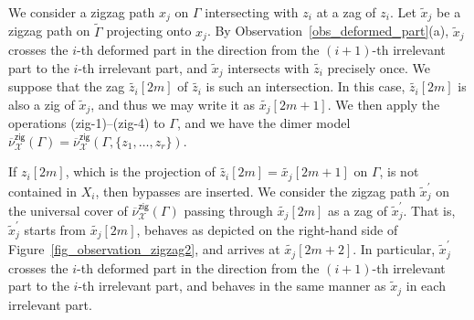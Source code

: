 \documentclass[11pt]{article}
\numberwithin{equation}{section}
\numberwithin{equation}{section}
\numberwithin{figure}{section}
\numberwithin{table}{section}
\newcommand{\calX}{\mathcal{X}}
\newcommand{\zig}{\mathsf{zig}}
\begin{document}
\begin{observation}
\label{obs_deformed_part3}
We consider a zigzag path $x_j$ on $\Gamma$ intersecting with $z_i$ at a zag of $z_i$.
Let $\widetilde{x}_j$ be a zigzag path on $\widetilde{\Gamma}$ projecting onto $x_j$.
By Observation~\ref{obs_deformed_part}(a), $\widetilde{x}_j$ crosses the $i$-th deformed part in the direction from the $(i+1)$-th irrelevant part to the $i$-th irrelevant part, and $\widetilde{x}_j$ intersects with $\widetilde{z_i}$ precisely once.
We suppose that the zag $\widetilde{z_i}[2m]$ of $\widetilde{z_i}$ is such an intersection.
In this case, $\widetilde{z_i}[2m]$ is also a zig of $\widetilde{x}_j$, and thus we may write it as $\widetilde{x_j}[2m+1]$.
We then apply the operations (zig-1)--(zig-4) to $\Gamma$, and we have the dimer model $\overline{\nu}_\calX^\zig(\Gamma)=\overline{\nu}_\calX^\zig(\Gamma,\{z_1,\dots,z_r\})$.

If $z_i[2m]$, which is the projection of $\widetilde{z_i}[2m]=\widetilde{x_j}[2m+1]$ on $\Gamma$, is not contained in $X_i$, then bypasses are inserted.
We consider the zigzag path $\widetilde{x}^\prime_j$ on the universal cover of $\overline{\nu}_\calX^\zig(\Gamma)$ passing through $\widetilde{x_j}[2m]$ as a zag of $\widetilde{x}^\prime_j$.
That is, $\widetilde{x}^\prime_j$ starts from $\widetilde{x_j}[2m]$, behaves as depicted on the right-hand side of Figure~\ref{fig_observation_zigzag2}, and arrives at $\widetilde{x_j}[2m+2]$.
In particular, $\widetilde{x}^\prime_j$ crosses the $i$-th deformed part in the direction from the $(i+1)$-th irrelevant part to the $i$-th irrelevant part,
and behaves in the same manner as $\widetilde{x}_j$ in each irrelevant part.

\begin{figure}[h!]\centering\vspace*{-31mm}
\end{figure}
\end{observation}
\end{document}
